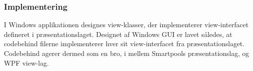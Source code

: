 \subsubsection{Implementering}
I Windows applikationen designes view-klasser, der implementerer view-interfacet defineret i præsentationslaget.
Designet af Windows GUI er lavet således, at codebehind filerne implementerer hver sit view-interfacet fra præsentationslaget. Codebehind agerer dermed som en bro, i mellem Smartpools præsentationslag, og WPF view-lag.

